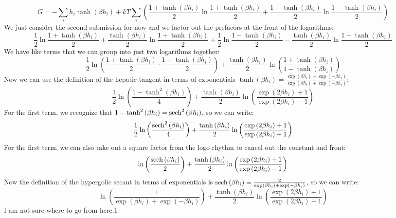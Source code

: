 \documentclass[12pt]{article}
\begin{document}
\begin{equation}
G=-\sum_i h_i \tanh \left(\beta h_i\right)+kT\sum_i\left(\frac{1+\tanh \left(\beta h_i\right)}{2} \ln \frac{1+\tanh \left(\beta h_i\right)}{2}+\frac{1-\tanh \left(\beta h_i\right)}{2} \ln \frac{1-\tanh \left(\beta h_i\right)}{2}\right)
\end{equation}
We just consider the second submission for now and we factor out the prefacors at the front of the logarithms:
\begin{equation}
\frac{1}{2} \ln \frac{1+\tanh \left(\beta h_i\right)}{2}+\frac{\tanh \left(\beta h_i\right)}{2} \ln \frac{1+\tanh \left(\beta h_i\right)}{2}+\frac{1}{2} \ln \frac{1-\tanh \left(\beta h_i\right)}{2}-\frac{\tanh \left(\beta h_i\right)}{2} \ln \frac{1-\tanh \left(\beta h_i\right)}{2}
\end{equation}
We have like terms that we can group into just two logarithms together:
\begin{equation}
\frac{1}{2} \ln \left(\frac{1+\tanh \left(\beta h_i\right)}{2}\cdot\frac{1-\tanh \left(\beta h_i\right)}{2}\right)+ \frac{\tanh \left(\beta h_i\right)}{2} \ln \left(\frac{1+\tanh \left(\beta h_i\right)}{1-\tanh \left(\beta h_i\right)}\right)
\end{equation}
Now we can use the definition of the hepatic tangent in terms of exponentials $\tanh \left(\beta h_i\right)=\frac{\exp \left(\beta h_i\right)-\exp \left(-\beta h_i\right)}{\exp \left(\beta h_i\right)+\exp \left(-\beta h_i\right)}$:
\begin{equation}
\frac{1}{2} \ln \left(\frac{1-\tanh^2 \left(\beta h_i\right)}{4}\right)+ \frac{\tanh \left(\beta h_i\right)}{2} \ln \left(\frac{\exp \left(2\beta h_i\right)+1}{\exp \left(2\beta h_i\right)-1}\right)
\end{equation}
For the first term, we recognize that $1-\tanh^2 \left(\beta h_i\right)=\sech^2 \left(\beta h_i\right)$, so we can write:
\begin{equation}
\frac{1}{2} \ln \left(\frac{\sech^2 \left(\beta h_i\right)}{4}\right)+ \frac{\tanh \left(\beta h_i\right)}{2} \ln \left(\frac{\exp \left(2\beta h_i\right)+1}{\exp \left(2\beta h_i\right)-1}\right)
\end{equation}
For the first term, we can also take out a square factor from the logo rhythm to cancel out the constant and front:
\begin{equation}
\ln \left(\frac{\sech \left(\beta h_i\right)}{2}\right)+ \frac{\tanh \left(\beta h_i\right)}{2} \ln \left(\frac{\exp \left(2\beta h_i\right)+1}{\exp \left(2\beta h_i\right)-1}\right)
\end{equation}
Now the definition of the hypergolic secant in terms of exponentials is $\sech \left(\beta h_i\right)=\frac{2}{\exp \left(\beta h_i\right)+\exp \left(-\beta h_i\right)}$, so we can write:
\begin{equation}
\ln \left(\frac{1}{\exp \left(\beta h_i\right)+\exp \left(-\beta h_i\right)}\right)+ \frac{\tanh \left(\beta h_i\right)}{2} \ln \left(\frac{\exp \left(2\beta h_i\right)+1}{\exp \left(2\beta h_i\right)-1}\right)
\end{equation}
I am not sure where to go from here.1 
\end{document}
